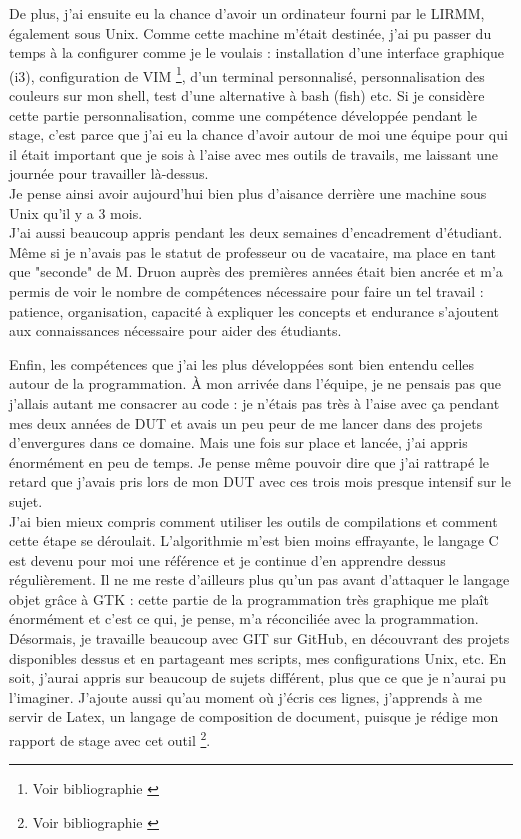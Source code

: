 \documentclass[11pt,french,a4paper]{report}
\begin{document}
De plus, j'ai ensuite eu la chance d'avoir un ordinateur fourni par le LIRMM, également sous Unix.
Comme cette machine m'était destinée, j'ai pu passer du temps à la configurer comme je le voulais : 
installation d'une interface graphique (i3), configuration de VIM \footnote{Voir bibliographie \cite{ref6}}, d'un terminal personnalisé, personnalisation des couleurs 
sur mon shell, test d'une alternative à bash (fish) etc. 
Si je considère cette partie personnalisation, comme une compétence développée pendant le stage, c'est parce que j'ai eu la chance 
d'avoir autour de moi une équipe pour qui il était important que je sois à l'aise avec mes outils de travails, me laissant une 
journée pour travailler là-dessus. \\
Je pense ainsi avoir aujourd'hui bien plus d'aisance derrière une machine sous Unix qu'il y a 3 mois. \\

J'ai aussi beaucoup appris pendant les deux semaines d'encadrement d'étudiant. Même si je n'avais pas le statut de professeur 
ou de vacataire, ma place en tant que "seconde" de M. Druon auprès des premières années était bien ancrée 
et m'a permis de voir le nombre de compétences nécessaire pour faire un tel travail : patience, organisation, 
capacité à expliquer les concepts et endurance s'ajoutent aux connaissances nécessaire pour aider des étudiants. 

Enfin, les compétences que j'ai les plus développées sont bien entendu celles autour de la programmation. 
À mon arrivée dans l'équipe, je ne pensais pas que j'allais autant me consacrer au code : je n'étais pas très à l'aise avec ça 
pendant mes deux années de DUT et avais un peu peur de me lancer dans des projets d'envergures dans ce domaine. 
Mais une fois sur place et lancée, j'ai appris énormément en peu de temps. Je pense même pouvoir dire que j'ai rattrapé le retard 
que j'avais pris lors de mon DUT avec ces trois mois presque intensif sur le sujet. \\
J'ai bien mieux compris comment utiliser les outils de compilations et comment cette étape se déroulait. L'algorithmie m'est bien moins
effrayante, le langage C est devenu pour moi une référence et je continue d'en apprendre dessus régulièrement. 
Il ne me reste d'ailleurs plus qu'un pas avant d'attaquer le langage objet grâce à GTK : cette partie de la programmation très graphique
me plaît énormément et c'est ce qui, je pense, m'a réconciliée avec la programmation. \\
Désormais, je travaille beaucoup avec GIT sur GitHub, en découvrant des projets disponibles dessus et en partageant mes scripts,
mes configurations Unix, etc. 
En soit, j'aurai appris sur beaucoup de sujets différent, plus que ce que je n'aurai pu l'imaginer.
J'ajoute aussi qu'au moment où j'écris ces lignes, j'apprends à me servir de Latex, un langage de composition de document, 
puisque je rédige mon rapport de stage avec cet outil \footnote{Voir bibliographie \cite{ref4} \cite{ref9}}.\\
\end{document}
